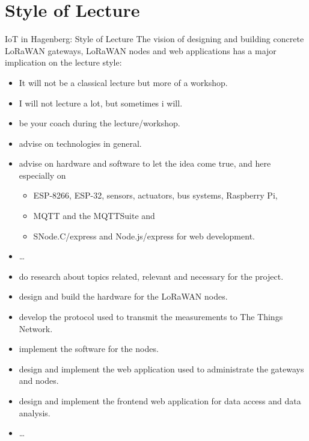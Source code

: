 ﻿\section[nosectionpage]{Style of Lecture}

\begin{frame}{IoT in Hagenberg: \alert{Style of Lecture}}
The vision of designing and building concrete LoRaWAN gateways, LoRaWAN nodes and web applications has a major implication on the lecture style:
\begin{itemize}
    \item It will \alert{not be a classical lecture} but more of a \alert{workshop}.
    \item I will \alert{not lecture a lot}, but sometimes i will.
\end{itemize}
\begin{description}
    \item [I will]
    \begin{itemize}
        \item be \alert{your coach} during the lecture/workshop.
        \item advise on technologies in general.
        \item advise on hardware and software to let the idea come true, and here especially on
        \begin{itemize}
            \item ESP-8266, ESP-32, sensors, actuators, bus systems, Raspberry Pi,
            \item MQTT and the MQTTSuite and
            \item SNode.C/express and Node.js/express for web development.
        \end{itemize}
        \item \ldots
    \end{itemize}
    \item[You will]
    \begin{itemize}
        \item do \alert{research about topics} related, relevant and necessary \alert{for the project}.
        \item \alert{design and build the hardware} for the LoRaWAN nodes.
        \item \alert{develop the protocol} used to transmit the measurements to \alert{The Things Network}.
        \item \alert{implement the software} for the nodes.
        \item \alert{design and implement the web application} used to administrate the gateways and nodes.
        \item \alert{design and implement the frontend web application} for \alert{data access} and \alert{data analysis}.
        \item \ldots
    \end{itemize}
\end{description}
\end{frame}
